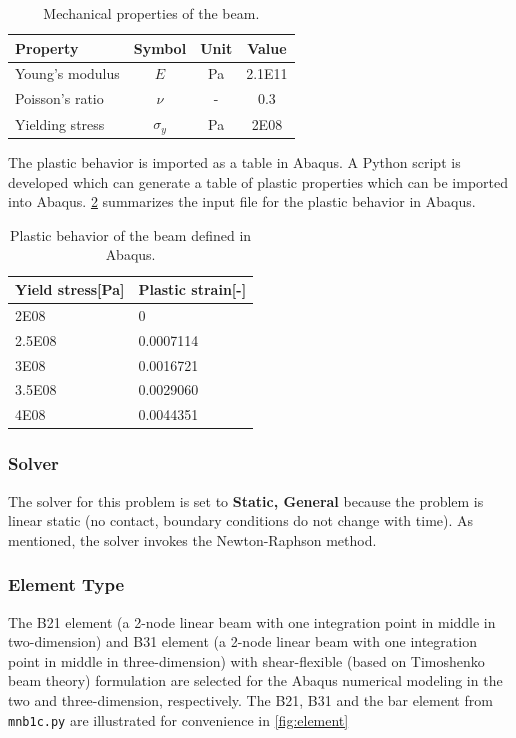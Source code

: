 \documentclass{article}
\begin{document}
\begin{table}[H]
    \centering
    \caption{Mechanical properties of the beam.}
    \begin{tabular}{l c c c} \hline
        Property & Symbol & Unit & Value \\ \hline
        Young's modulus & $E$& Pa & 2.1E11 \\
        Poisson's ratio & $\nu$ & - & 0.3 \\
        Yielding stress & $\sigma_y$ & Pa & 2E08 \\ \hline
    \end{tabular} 
    \label{tab:mat_prop}
\end{table}

The plastic behavior is imported as a table in Abaqus. A Python script is developed which can generate a table of plastic properties which can be imported into Abaqus. \cref{tab:plastic_prop} summarizes the input file for the plastic behavior in Abaqus.

\begin{table}[H]
    \centering
    \caption{Plastic behavior of the beam defined in Abaqus.}
    \label{tab:plastic_prop}
    \begin{tabular}{ll} \hline
        Yield stress[Pa] & Plastic strain[-] \\ \hline
        2E08 & 0 \\
        2.5E08 & 0.0007114 \\
        3E08 & 0.0016721 \\
        3.5E08 & 0.0029060 \\
        4E08 & 0.0044351  \\ \hline
    \end{tabular}
\end{table}

\subsubsection{Solver}
The solver for this problem is set to \textbf{Static, General} because the problem is linear static (no contact, boundary conditions do not change with time). As mentioned, the solver invokes the Newton-Raphson method.

\subsubsection{Element Type}
The B21 element (a 2-node linear beam with one integration point in middle in two-dimension) and B31 element (a 2-node linear beam with one integration point in middle in three-dimension) with shear-flexible (based on Timoshenko beam theory) formulation are selected for the Abaqus numerical modeling in the two and three-dimension, respectively. The B21, B31 and the bar element from \texttt{mnb1c.py} are illustrated for convenience in \cref{fig:element}
\end{document}
